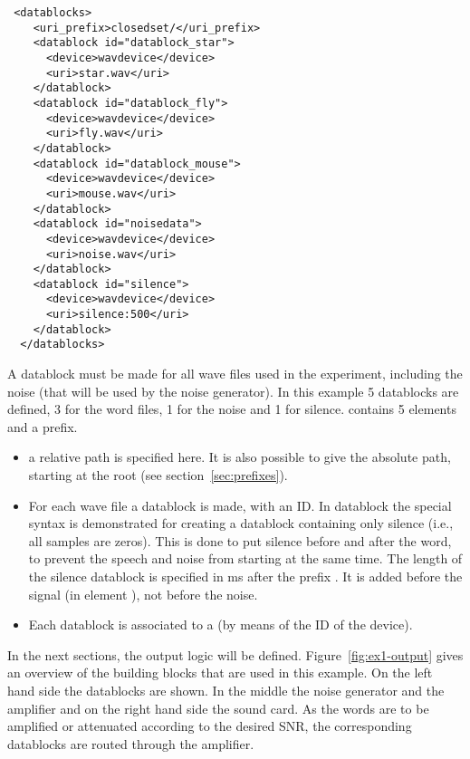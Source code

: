 \begin{lstlisting}
 <datablocks>
    <uri_prefix>closedset/</uri_prefix>
    <datablock id="datablock_star">
      <device>wavdevice</device>
      <uri>star.wav</uri>
    </datablock>
    <datablock id="datablock_fly">
      <device>wavdevice</device>
      <uri>fly.wav</uri>
    </datablock>
    <datablock id="datablock_mouse">
      <device>wavdevice</device>
      <uri>mouse.wav</uri>
    </datablock>
    <datablock id="noisedata">
      <device>wavdevice</device>
      <uri>noise.wav</uri>
    </datablock>
    <datablock id="silence">
      <device>wavdevice</device>
      <uri>silence:500</uri>
    </datablock>
  </datablocks>
\end{lstlisting}

A datablock must be made for all wave files used in the
experiment, including the noise (that will be used by the noise
generator). In this example 5 datablocks are defined, 3 for the word files, 1
for the noise and 1 for silence.
 contains 5  elements and a
prefix.
\begin{itemize}
\item {} a relative path is specified here. It
is also possible to give the absolute path, starting at the root
(see section~\ref{sec:prefixes}).
\item {} For each wave file a datablock is made,
with an ID.  In datablock
 the special syntax is demonstrated for creating a
datablock containing only silence (i.e., all samples are zeros).
This is done to put silence before and after the
word, to prevent the speech and noise from
starting at the same time. The length of the silence datablock is specified in ms
after the prefix . It is added before the signal (in element ), not
before the noise.

\item Each datablock is associated to a
 (by means of the ID of the device).

\end{itemize}
  
 


In the next sections, the output logic will be defined.
Figure~\ref{fig:ex1-output} gives an overview of the building
blocks that are used in this example. On the left hand side the
datablocks are shown. In the middle the noise generator and the
amplifier and on the right hand side the sound card. As the words
are to be amplified or attenuated according to the desired SNR,
the corresponding datablocks are routed through the amplifier.

